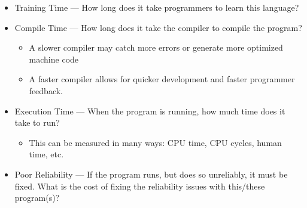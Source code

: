 \begin{itemize}[noitemsep]
\item Training Time --- How long does it take programmers to learn this language?
\item Compile Time --- How long does it take the compiler to compile the program?
  \begin{itemize}[noitemsep]
  \item A slower compiler may catch more errors or generate more optimized machine code
  \item A faster compiler allows for quicker development and faster programmer feedback.
  \end{itemize}

\item Execution Time --- When the program is running, how much time does it take to run?
  \begin{itemize}[noitemsep]
  \item This can be measured in many ways: CPU time, CPU cycles, human time, etc.
  \end{itemize}

\item Poor Reliability --- If the program runs, but does so unreliably, it must be fixed. What is the cost of fixing the reliability issues with this/these program(s)?
\end{itemize}

